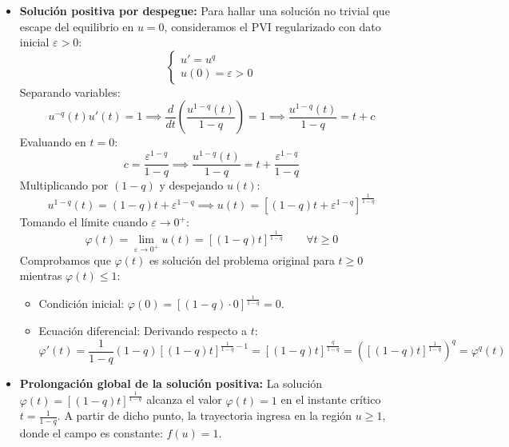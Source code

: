{\begin{itemize}
        \item \textbf{Solución positiva por despegue:} Para hallar una solución no trivial que escape del equilibrio en $u = 0$, consideramos el PVI regularizado con dato inicial $\varepsilon > 0$:
        \[
            \begin{cases}
                u' = u^q \\
                u(0) = \varepsilon > 0
            \end{cases}
        \]
        Separando variables:
        \[
            u^{-q}(t) u'(t) = 1 \implies \frac{d}{dt} \left( \frac{u^{1-q}(t)}{1-q} \right) = 1 \implies \frac{u^{1-q}(t)}{1-q} = t + c
        \]
        Evaluando en $t = 0$:
        \[
            c = \frac{\varepsilon^{1-q}}{1-q} \implies \frac{u^{1-q}(t)}{1-q} = t + \frac{\varepsilon^{1-q}}{1-q}
        \]
        Multiplicando por $(1 - q)$ y despejando $u(t)$:
        \[
            u^{1-q}(t) = (1 - q)t + \varepsilon^{1-q} \implies u(t) = \left[ (1 - q)t + \varepsilon^{1-q} \right]^{\frac{1}{1-q}}
        \]
        Tomando el límite cuando $\varepsilon \to 0^+$:
        \[
            \varphi(t) = \lim_{\varepsilon \to 0^+} u(t) = \left[ (1 - q)t \right]^{\frac{1}{1-q}} \qquad \forall t \geq 0
        \]
        Comprobamos que $\varphi(t)$ es solución del problema original para $t \geq 0$ mientras $\varphi(t) \leq 1$:
        \begin{itemize}
            \item Condición inicial: $\varphi(0) = \left[ (1 - q)\cdot 0 \right]^{\frac{1}{1-q}} = 0$.
            \item Ecuación diferencial: Derivando respecto a $t$:
            \[
                \varphi'(t) = \frac{1}{1 - q} (1 - q) \left[ (1 - q)t \right]^{\frac{1}{1-q} - 1} = \left[ (1 - q)t \right]^{\frac{q}{1-q}} = \left( \left[ (1 - q)t \right]^{\frac{1}{1-q}} \right)^q = \varphi^q(t)
            \]
        \end{itemize}
        \item \textbf{Prolongación global de la solución positiva:} La solución $\varphi(t) = \left[ (1 - q)t \right]^{\frac{1}{1-q}}$ alcanza el valor $\varphi(t) = 1$ en el instante crítico $t = \frac{1}{1 - q}$. A partir de dicho punto, la trayectoria ingresa en la región $u \geq 1$, donde el campo es constante: $f(u) = 1$.
        

\end{itemize}}
